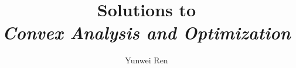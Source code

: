 

\title{Solutions to\\
\textit{Convex Analysis and Optimization}}
\author{Yunwei Ren}
\date{}


\maketitle
\tableofcontents

\newpage

\newpage



